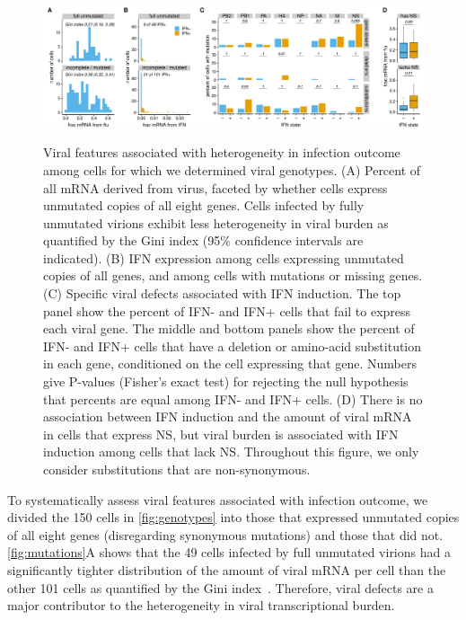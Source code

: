 \documentclass[lineno]{asm-article}
\newcommand{\FIG}[1]{\autoref{fig:#1}}
\begin{document}
\begin{figure}
\begin{fullwidth}
{\centering
\includegraphics[width=\linewidth]{figures/single_cell_figures/p_mutations.pdf}
}
\caption{
Viral features associated with heterogeneity in infection outcome among cells for which we determined viral genotypes.
(A) 
Percent of all mRNA derived from virus, faceted by whether cells express unmutated copies of all eight genes.
Cells infected by fully unmutated virions exhibit less heterogeneity in viral burden as quantified by the Gini index (95\% confidence intervals are indicated).
(B)
IFN expression among cells expressing unmutated copies of all genes, and among cells with mutations or missing genes.
(C)
Specific viral defects associated with IFN induction.
The top panel show the percent of IFN- and IFN+ cells that fail to express each viral gene.
The middle and bottom panels show the percent of IFN- and IFN+ cells that have a deletion or amino-acid substitution in each gene, conditioned on the cell expressing that gene.
Numbers give P-values (Fisher's exact test) for rejecting the null hypothesis that percents are equal among IFN- and IFN+ cells. 
(D)
There is no association between IFN induction and the amount of viral mRNA in cells that express NS, but viral burden is associated with IFN induction among cells that lack NS.
Throughout this figure, we only consider substitutions that are non-synonymous.
}
\label{fig:mutations}

\end{fullwidth}
\end{figure}

To systematically assess viral features associated with infection outcome, we divided the 150 cells in \FIG{genotypes} into those that expressed unmutated copies of all eight genes (disregarding synonymous mutations) and those that did not.
\FIG{mutations}A shows that the 49 cells infected by full unmutated virions had a significantly tighter distribution of the amount of viral mRNA per cell than the other 101 cells as quantified by the Gini index~\cite{gini1921measurement}.
Therefore, viral defects are a major contributor to the heterogeneity in viral transcriptional burden.
\end{document}
